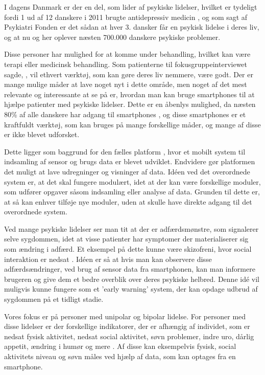 I dagens Danmark er der en del, som lider af psykiske lidelser, hvilket er tydeligt fordi 1 ud af 12 danskere i 2011 brugte antidepressiv medicin \citep{misc:forbrugAntidepressiva}, og som sagt af Psykiatri Fonden er det sådan at hver 3. dansker får en psykisk lidelse i deres liv, og at nu og her oplever næsten 700.000 danskere psykiske problemer\citep{psykiatrifonden}. 

Disse personer har mulighed for at komme under behandling, hvilket kan være terapi eller medicinsk behandling.
Som patienterne til fokusgruppeinterviewet sagde, \citep[Kapitel 1, Sektion 5]{misc:faellesrapp} , vil ethvert værktøj, som kan gøre deres liv nemmere, være godt.
Der er mange mulige måder at lave noget nyt i dette område, men noget af det mest relevante og interessante at se på er, hvordan man kan bruge smartphones til at hjælpe patienter med psykiske lidelser.
Dette er en åbenlys mulighed, da næsten 80\% af alle danskere har adgang til smartphones \citep{misc:dstElektronik}, og disse smartphones er et kraftfuldt værktøj, som kan bruges på mange forskellige måder, og mange af disse er ikke blevet udforsket.

Dette ligger som baggrund for den fælles platform \citep{misc:faellesrapp}, hvor et mobilt system til indsamling af sensor og brugs data er blevet udviklet. 
Endvidere gør platformen det muligt at lave udregninger og visninger af data.
Idéen ved det overordnede system er, at det skal fungere modulært, idet at der kan være forskellige moduler, som udfører opgaver såsom indsamling eller analyse af data. 
Grunden til dette er, at så kan enhver tilføje nye moduler, uden at skulle have direkte adgang til det overordnede system.

Ved mange psykiske lidelser ser man tit at der er adfærdsmønstre, som signalerer selve sygdommen, idet at visse patienter har symptomer der materialiserer sig som ændring i adfærd.
Et eksempel på dette kunne være skizofreni, hvor social interaktion er nedsat \citep{misc:negativeSymptomsSchizo}.
Idéen er så at hvis man kan observere disse adfærdsændringer, ved brug af sensor data fra smartphonen, kan man informere brugeren og give dem et bedre overblik over deres psykiske helbred.
Denne idé vil muligvis kunne fungere som et 'early warning' system, der kan opdage udbrud af sygdommen på et tidligt stadie.

Vores fokus er på personer med unipolar og bipolar lidelse. 
For personer med disse lidelser er der forskellige indikatorer, der er afhængig af individet, som er nedsat fysisk aktivitet, nedsat social aktivitet, søvn problemer, indre uro, dårlig appetit, ændring i humør og mere \citep{misc:faellesrapp}.
Af disse kan eksempelvis fysisk, social aktivitets niveau og søvn måles ved hjælp af data, som kan optages fra en smartphone.

